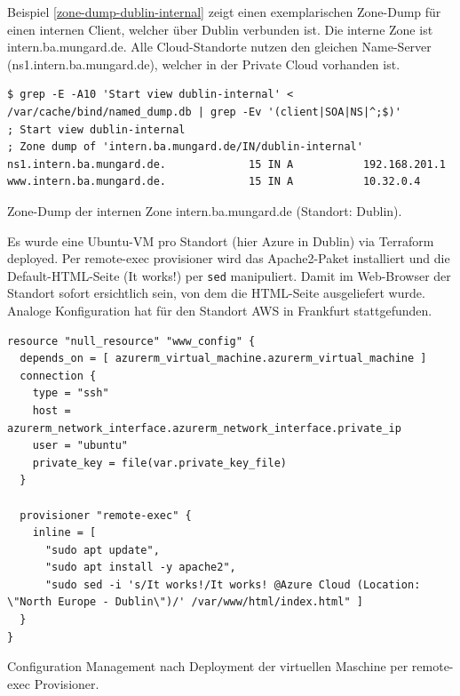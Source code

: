 Beispiel \ref{zone-dump-dublin-internal} zeigt einen exemplarischen Zone-Dump für einen internen Client, welcher über Dublin verbunden ist. Die interne Zone ist intern.ba.mungard.de. Alle Cloud-Standorte nutzen den gleichen Name-Server (ns1.intern.ba.mungard.de), welcher in der Private Cloud vorhanden ist.\\
\begin{listing}[h]
\begin{verbatim}
$ grep -E -A10 'Start view dublin-internal' < /var/cache/bind/named_dump.db | grep -Ev '(client|SOA|NS|^;$)'
; Start view dublin-internal
; Zone dump of 'intern.ba.mungard.de/IN/dublin-internal'
ns1.intern.ba.mungard.de.             15 IN A           192.168.201.1
www.intern.ba.mungard.de.             15 IN A           10.32.0.4
\end{verbatim}
\caption{Zone-Dump der internen Zone intern.ba.mungard.de (Standort: Dublin).}
\label{zone-dump-dublin-internal}
\end{listing}\FloatBarrier
Es wurde eine Ubuntu-VM pro Standort (hier Azure in Dublin) via Terraform deployed. Per remote-exec provisioner wird das Apache2-Paket installiert und die Default-HTML-Seite (\glqq It works!\grqq{}) per \texttt{sed} manipuliert. Damit im Web-Browser der Standort sofort ersichtlich sein, von dem die HTML-Seite ausgeliefert wurde. Analoge Konfiguration hat für den Standort AWS in Frankfurt stattgefunden.
\begin{listing}[h]
\begin{verbatim}
resource "null_resource" "www_config" {
  depends_on = [ azurerm_virtual_machine.azurerm_virtual_machine ]
  connection {
    type = "ssh"
    host = azurerm_network_interface.azurerm_network_interface.private_ip
    user = "ubuntu"
    private_key = file(var.private_key_file)
  }

  provisioner "remote-exec" {
    inline = [
      "sudo apt update",
      "sudo apt install -y apache2",
      "sudo sed -i 's/It works!/It works! @Azure Cloud (Location: \"North Europe - Dublin\")/' /var/www/html/index.html" ]
  }
}
\end{verbatim}
\caption{Configuration Management nach Deployment der virtuellen Maschine per remote-exec Provisioner.}
\label{sed-replace-apache-location}
\end{listing}\FloatBarrier

